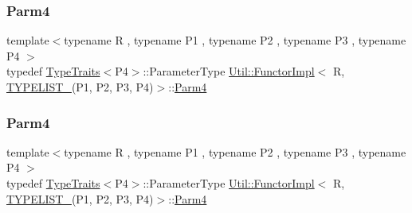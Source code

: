\subsubsection{\texorpdfstring{Parm4}{Parm4}\hspace{0.1cm}{\footnotesize\ttfamily [2/3]}}
{\footnotesize\ttfamily template$<$typename R , typename P1 , typename P2 , typename P3 , typename P4 $>$ \\
typedef \mbox{\hyperlink{classUtil_1_1TypeTraits}{Type\+Traits}}$<$P4$>$\+::Parameter\+Type \mbox{\hyperlink{classUtil_1_1FunctorImpl}{Util\+::\+Functor\+Impl}}$<$ R, \mbox{\hyperlink{adat__devel__install_2include_2adat_2typelist_8h_a7a156c571ab21a16b0495e1c882a07fa}{T\+Y\+P\+E\+L\+I\+S\+T\+\_}}(P1, P2, P3, P4)$>$\+::\mbox{\hyperlink{structUtil_1_1Private_1_1FunctorImplBase_a1ad7fe3f243480c44a610927ebe76762}{Parm4}}}

\mbox{\label{classUtil_1_1FunctorImpl_3_01R_00_01TYPELIST__4_07P1_00_01P2_00_01P3_00_01P4_08_4_a7375a2710126cb146191bd1c17af2f1d}} 
\subsubsection{\texorpdfstring{Parm4}{Parm4}\hspace{0.1cm}{\footnotesize\ttfamily [3/3]}}
{\footnotesize\ttfamily template$<$typename R , typename P1 , typename P2 , typename P3 , typename P4 $>$ \\
typedef \mbox{\hyperlink{classUtil_1_1TypeTraits}{Type\+Traits}}$<$P4$>$\+::Parameter\+Type \mbox{\hyperlink{classUtil_1_1FunctorImpl}{Util\+::\+Functor\+Impl}}$<$ R, \mbox{\hyperlink{adat__devel__install_2include_2adat_2typelist_8h_a7a156c571ab21a16b0495e1c882a07fa}{T\+Y\+P\+E\+L\+I\+S\+T\+\_}}(P1, P2, P3, P4)$>$\+::\mbox{\hyperlink{structUtil_1_1Private_1_1FunctorImplBase_a1ad7fe3f243480c44a610927ebe76762}{Parm4}}}

\mbox{\label{classUtil_1_1FunctorImpl_3_01R_00_01TYPELIST__4_07P1_00_01P2_00_01P3_00_01P4_08_4_a9218a4b4370d688d3e144a75e5d24cfe}} 
